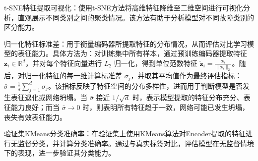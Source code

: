 \documentclass[master]{thesis-uestc}
\begin{document}
    t-SNE特征提取可视化：使用t-SNE方法将高维特征降维至二维空间进行可视化分析，直观展示不同类别之间的聚类情况。该方法有助于分析模型对不同故障类别的区分能力。
    
    归一化特征标准差：用于衡量编码器所提取特征的分布情况，从而评估对比学习模型的表征能力。具体方法为：对训练集中所有样本，通过预训练编码器提取特征 $\mathbf{z}_i \in \mathbb{R}^d$，并对每个特征向量进行 $L_2$ 归一化，得到单位范数特征 $\tilde{\mathbf{z}}_i = \frac{\mathbf{z}_i}{\|\mathbf{z}_i\|_2}$。随后，对归一化特征的每一维计算标准差 $\sigma_j$，并取其平均值作为最终评估指标：$\bar{\sigma} = \frac{1}{d} \sum_{j=1}^d \sigma_j$。该指标反映了特征空间的分布多样性，进而用于判断模型是否发生表征退化或网络坍塌。当 $\bar{\sigma}$ 接近 $1/\sqrt{d}$ 时，表示模型提取的特征分布充分、表征能力良好；而当 $\bar{\sigma} \to 0$ 时，则表明所有特征趋于一致，网络可能已发生坍塌，丧失有效表征能力。
    
    验证集KMeans分类准确率：在验证集上使用KMeans算法对Encoder提取的特征进行无监督分类，并计算分类准确率。通过与真实标签对比，评估模型在无监督情境下的表现，进一步验证其分类能力。

\FloatBarrier  %
\end{document}
